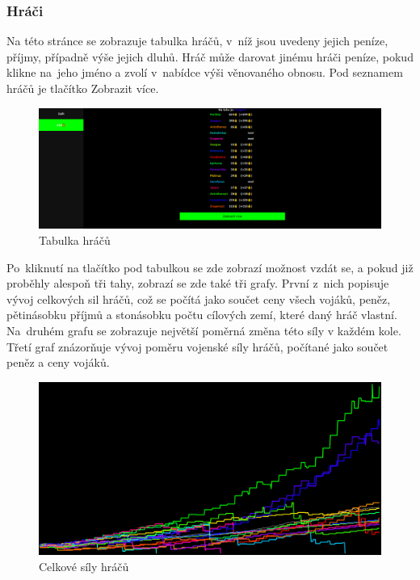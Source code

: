 \documentclass[a4paper,12pt]{article}
\begin{document}
\subsubsection{Hráči}
Na této stránce se zobrazuje tabulka hráčů, v~níž jsou uvedeny jejich peníze, příjmy, případně výše jejich dluhů. Hráč může darovat jinému hráči peníze, pokud klikne na~jeho jméno a zvolí v~nabídce výši věnovaného obnosu. Pod seznamem hráčů je tlačítko Zobrazit více.
\begin{figure}[H]
	\includegraphics[width=\textwidth]{Players.png}
	\caption{Tabulka hráčů}
\end{figure}

Po~kliknutí na tlačítko pod tabulkou se zde zobrazí možnost vzdát se, a pokud již proběhly alespoň tři tahy, zobrazí se zde také tři grafy. První z~nich popisuje vývoj celkových sil hráčů, což se počítá jako součet ceny všech vojáků, peněz, pětinásobku příjmů a stonásobku počtu cílových zemí, které daný hráč vlastní. Na~druhém grafu se zobrazuje největší poměrná změna této síly v každém kole. Třetí graf znázorňuje vývoj poměru vojenské síly hráčů, počítané jako součet peněz a ceny vojáků.

\begin{figure}[H]
	\includegraphics[width=\textwidth]{PowersGraph.png}
	\caption{Celkové síly hráčů}
\end{figure}
\end{document}
